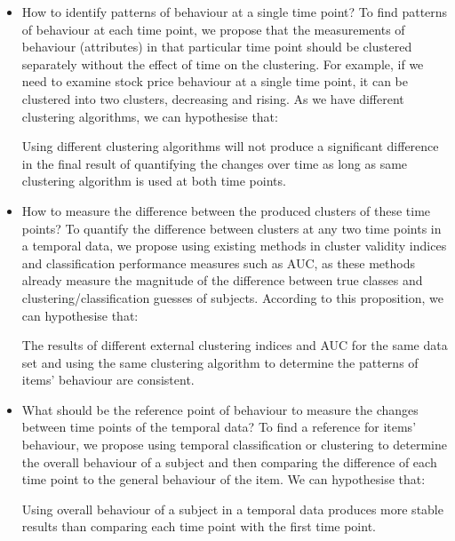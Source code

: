 \begin{itemize}
	
	\item How to identify patterns of behaviour at a single time point? To find patterns of behaviour at each time point, we propose that the measurements of behaviour (attributes) in that particular time point should be clustered separately without the effect of time on the clustering. For example, if we need to examine stock price behaviour at a single time point,  it can be clustered into two clusters, decreasing and rising. As we have different clustering algorithms,  we can hypothesise that:
	\begin{hyp} \label{hypo:diffCluster}
		Using different clustering algorithms will not produce a significant difference in the final result of quantifying the changes over time as long as same clustering algorithm is used at both time points.
	\end{hyp}
	
	\item How to measure the difference between the produced clusters of these time points? To quantify the difference between clusters at any two time points in a temporal data, we propose using existing methods in cluster validity indices and classification performance measures such as AUC, as these methods already measure the magnitude of the difference between true classes and clustering/classification guesses of subjects. According to this proposition, we can hypothesise that: 
	\begin{hyp} \label{hypo:diffCVI}
		The results of different external clustering indices and AUC for the same data set and using the same clustering algorithm to determine the patterns of items' behaviour are consistent. 
	\end{hyp}
	
	\item What should be the reference point of behaviour to measure the changes between time points of the temporal data? To find a reference for items' behaviour, we propose using temporal classification or clustering to determine the overall behaviour of a subject and then comparing the difference of each time point to the general behaviour of the item. We can hypothesise that:
	\begin{hyp} \label{hypo:overallBehavoiur} 
		Using overall behaviour of a subject in a temporal data produces more stable results than comparing each time point with the first time point.
	\end{hyp}
	

\end{itemize}

